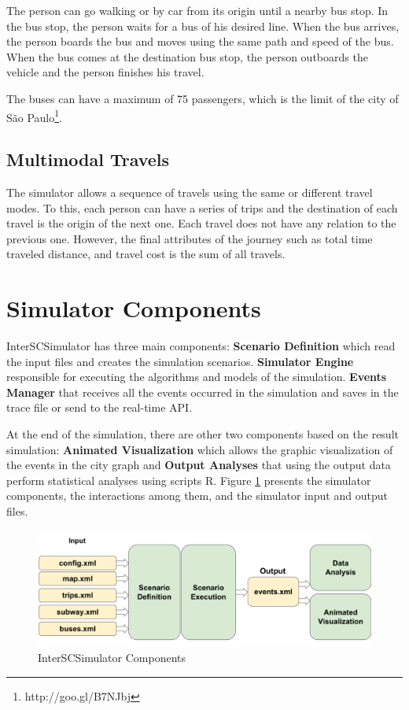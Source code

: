 The person can go walking or by car from its origin until a nearby bus stop. In the bus stop, the person waits for a bus of his desired line. When the bus arrives, the person boards the bus and moves using the same path and speed of the bus. When the bus comes at the destination bus stop, the person outboards the vehicle and the person finishes his travel.

The buses can have a maximum of 75 passengers, which is the limit of the city of S\~ao Paulo\footnote{http://goo.gl/B7NJbj}. 

\subsection{Multimodal Travels}

The simulator allows a sequence of travels using the same or different travel modes. To this, each person can have a series of trips and the destination of each travel is the origin of the next one. Each travel does not have any relation to the previous one. However, the final attributes of the journey such as total time traveled distance, and travel cost is the sum of all travels.

\section{Simulator Components}
\label{sub:components}

InterSCSimulator has three main components: \textbf{Scenario Definition} which read the input files and creates the simulation scenarios. \textbf{Simulator Engine} responsible for executing the algorithms and models of the simulation. \textbf{Events Manager} that receives all the events occurred in the simulation and saves in the trace file or send to the real-time API.

At the end of the simulation, there are other two components based on the result simulation: \textbf{Animated Visualization} which allows the graphic visualization of the events in the city graph and \textbf{Output Analyses} that using the output data perform statistical analyses using scripts R. Figure \ref{fig:simComponents} presents the simulator components, the interactions among them, and the simulator input and output files.

\begin{figure}[!htb]
\centering
\includegraphics[width=1\textwidth]{figuras/chap-interscsimulator/components.pdf}
\caption{InterSCSimulator Components}
\label{fig:simComponents}
\end{figure}

